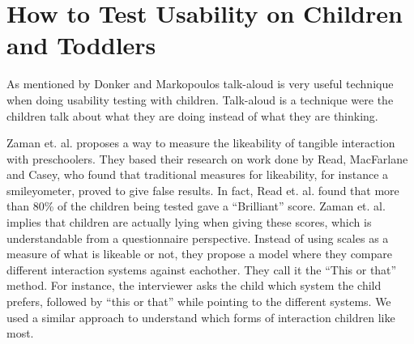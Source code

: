 \section{How to Test Usability on Children and Toddlers}
\label{sec:usabilitytestchildren}
% 
% 

As mentioned by Donker and Markopoulos\cite{TalkAloud} talk-aloud is very useful technique when doing usability testing with children. Talk-aloud is a technique were the children talk about what they are doing instead of what they are thinking.

Zaman et. al. proposes a way to measure the likeability of tangible interaction with preschoolers\cite{zaman2007measure}. They based their research on work done by Read, MacFarlane and Casey\cite{read2002endurability}, who found that traditional measures for likeability, for instance a smileyometer, proved to give false results. In fact, Read et. al. found that more than 80\% of the children being tested gave a ``Brilliant'' score. Zaman et. al. implies that children are actually lying when giving these scores, which is understandable from a questionnaire perspective. Instead of using scales as a measure of what is likeable or not, they propose a model where they compare different interaction systems against eachother. They call it the ``This or that'' method. For instance, the interviewer asks the child which system the child prefers, followed by ``this or that'' while pointing to the different systems. We used a similar approach to understand which forms of interaction children like most.  



